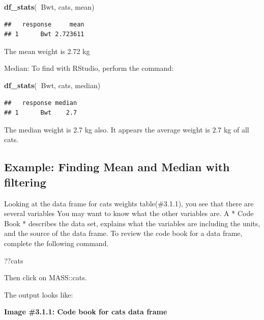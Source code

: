 \documentclass[
]{book}
\newenvironment{Shaded}{\begin{snugshade}}{\end{snugshade}}
\newcommand{\KeywordTok}[1]{\textcolor[rgb]{0.13,0.29,0.53}{\textbf{#1}}}
\newcommand{\NormalTok}[1]{#1}
\newcommand{\OperatorTok}[1]{\textcolor[rgb]{0.81,0.36,0.00}{\textbf{#1}}}
\begin{document}
\begin{Shaded}
\begin{Highlighting}[]
\KeywordTok{df_stats}\NormalTok{(}\OperatorTok{~}\NormalTok{Bwt, cats, mean)}
\end{Highlighting}
\end{Shaded}

\begin{verbatim}
##   response     mean
## 1      Bwt 2.723611
\end{verbatim}

The mean weight is 2.72 kg

Median:
To find with RStudio, perform the command:

\begin{Shaded}
\begin{Highlighting}[]
\KeywordTok{df_stats}\NormalTok{(}\OperatorTok{~}\NormalTok{Bwt, cats, median)}
\end{Highlighting}
\end{Shaded}

\begin{verbatim}
##   response median
## 1      Bwt    2.7
\end{verbatim}

The median weight is 2.7 kg also. It appears the average weight is 2.7 kg of all cats.

\hypertarget{example-finding-mean-and-median-with-filtering}{%
\subsection{Example: Finding Mean and Median with filtering}\label{example-finding-mean-and-median-with-filtering}}

Looking at the data frame for cats weights table(\#3.1.1), you see that there are several variables You may want to know what the other variables are. A * Code Book * describes the data set, explains what the variables are including the units, and the source of the data frame. To review the code book for a data frame, complete the following command.

\begin{Shaded}
\begin{Highlighting}[]
\NormalTok{??cats}
\end{Highlighting}
\end{Shaded}

Then click on MASS::cats.

The output looks like:

\textbf{Image \#3.1.1: Code book for cats data frame}
\end{document}
